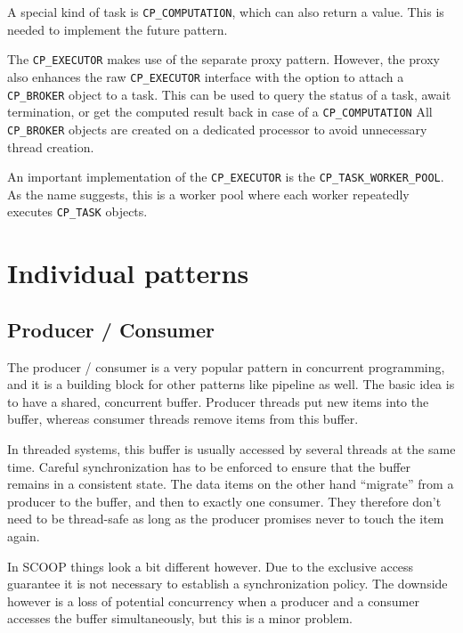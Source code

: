 \documentclass[a4paper,10pt]{report}
\begin{document}
A special kind of task is \lstinline!CP_COMPUTATION!, which can also return a value.
This is needed to implement the future pattern.

The \lstinline!CP_EXECUTOR! makes use of the separate proxy pattern.
However, the proxy also enhances the raw \lstinline!CP_EXECUTOR! interface with the option to attach a \lstinline!CP_BROKER! object to a task.
This can be used to query the status of a task, await termination, or get the computed result back in case of a \lstinline!CP_COMPUTATION!
All \lstinline!CP_BROKER! objects are created on a dedicated processor to avoid unnecessary thread creation.

An important implementation of the \lstinline!CP_EXECUTOR! is the \lstinline!CP_TASK_WORKER_POOL!.
As the name suggests, this is a worker pool where each worker repeatedly executes \lstinline!CP_TASK! objects.

\section {Individual patterns}

\subsection{Producer / Consumer}

The producer / consumer is a very popular pattern in concurrent programming, and it is a building block for other patterns like pipeline as well.
The basic idea is to have a shared, concurrent buffer.
Producer threads put new items into the buffer, whereas consumer threads remove items from this buffer.


In threaded systems, this buffer is usually accessed by several threads at the same time.
Careful synchronization has to be enforced to ensure that the buffer remains in a consistent state.
The data items on the other hand ``migrate'' from a producer to the buffer, and then to exactly one consumer.
They therefore don't need to be thread-safe as long as the producer promises never to touch the item again.

In SCOOP things look a bit different however.
Due to the exclusive access guarantee it is not necessary to establish a synchronization policy.
The downside however is a loss of potential concurrency when a producer and a consumer accesses the buffer simultaneously, but this is a minor problem.
\end{document}
